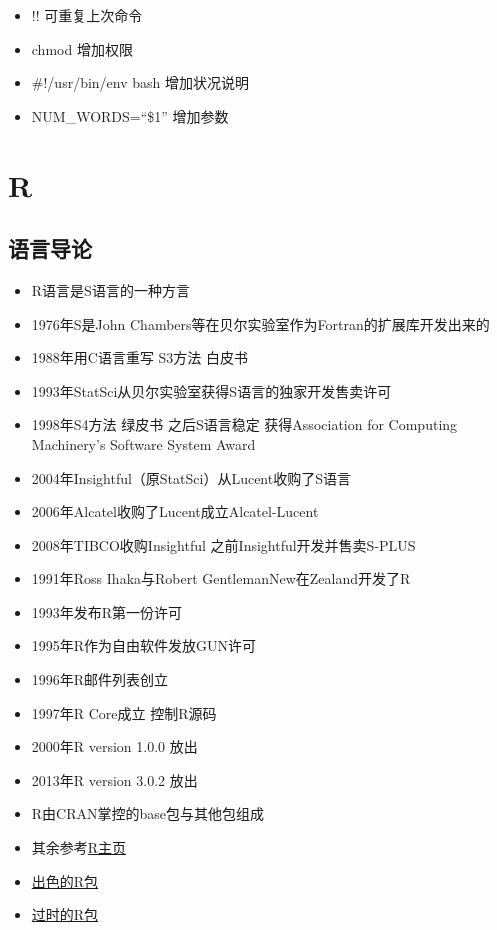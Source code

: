 \documentclass[]{book}
\providecommand{\tightlist}{%
  \setlength{\itemsep}{0pt}\setlength{\parskip}{0pt}}
\begin{document}
\begin{itemize}
\item
  !! 可重复上次命令
\item
  chmod 增加权限
\item
  \#!/usr/bin/env bash 增加状况说明
\item
  NUM\_WORDS=``\$1'' 增加参数
\end{itemize}

\hypertarget{r}{%
\section{R}\label{r}}

\subsection{语言导论}

\begin{itemize}
\tightlist
\item
  R语言是S语言的一种方言
\item
  1976年S是John Chambers等在贝尔实验室作为Fortran的扩展库开发出来的
\item
  1988年用C语言重写 S3方法 白皮书
\item
  1993年StatSci从贝尔实验室获得S语言的独家开发售卖许可
\item
  1998年S4方法 绿皮书 之后S语言稳定 获得Association for Computing Machinery's Software System Award
\item
  2004年Insightful（原StatSci）从Lucent收购了S语言
\item
  2006年Alcatel收购了Lucent成立Alcatel-Lucent
\item
  2008年TIBCO收购Insightful 之前Insightful开发并售卖S-PLUS
\item
  1991年Ross Ihaka与Robert GentlemanNew在Zealand开发了R
\item
  1993年发布R第一份许可
\item
  1995年R作为自由软件发放GUN许可
\item
  1996年R邮件列表创立
\item
  1997年R Core成立 控制R源码
\item
  2000年R version 1.0.0 放出
\item
  2013年R version 3.0.2 放出
\item
  R由CRAN掌控的base包与其他包组成
\item
  其余参考\href{http://www.r-project.org/}{R主页}
\item
  \href{https://github.com/qinwf/awesome-R}{出色的R包}
\item
  \href{http://kbroman.org/hipsteR/}{过时的R包}
\end{itemize}
\end{document}
